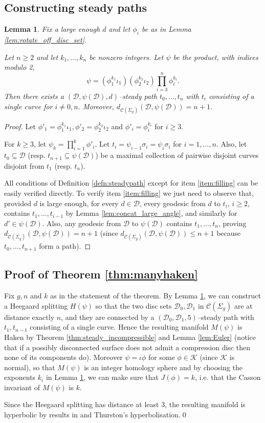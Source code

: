 \documentclass[11pt, oneside]{amsart}
\newtheorem{lemma}{Lemma}[section]
\theoremstyle{definition}
\theoremstyle{definition}
\newcommand{\calC} {\ensuremath {\mathcal{C}}}
\newcommand{\calD} {\ensuremath {\mathcal{D}}}
\begin{document}
 
 \subsection{Constructing steady paths}
 
 \begin{lemma}\label{lem:product}
 Fix a large enough $d$ and let $\phi_i$ be as in Lemma \ref{lem:rotate_off_disc_set}.
 
  Let $n\geq 2$ and let $k_1,\dots,k_n$ be nonzero integers. Let $\psi$ be the product, with indices modulo 2,
  $$\psi=(\phi^{k_1}_1\iota_1)(\phi^{k_2}_2\iota_2)\prod_{i=3}^{n}\phi^{k_i}_i.$$
  Then there exists a $(\calD,\psi(\calD),d)$--steady path $t_0,\dots,t_n$ with $t_i$ consisting of a single curve for $i\neq 0,n$. Moreover, $d_{\calC(\Sigma_g)}(\calD,\psi(\calD))=n+1$.
 \end{lemma}


\begin{proof}
Let $\phi'_1=\phi^{k_1}_1\iota_1,\phi'_2=\phi^{k_2}_2\iota_2$ and $\phi'_i=\phi^{k_i}_i$ for $i\geq 3$.

For $k\geq 3$, let $\psi_k=\prod_{i=1}^{k}\phi'_i$. Let $t_i=\psi_{i-1}\sigma_i=\psi_i\sigma_i$ for $i=1,\dots,n$. Also, let $t_0\subseteq \calD$ (resp. $t_{n+1}\subseteq \psi(\calD)$) be a maximal collection of pairwise disjoint curves disjoint from $t_1$ (resp. $t_n$).

All conditions of Definition \ref{defn:steadypath} except for item \ref{item:filling} can be easily verified directly. To verify item \ref{item:filling} we just need to observe that, provided $d$ is large enough, for every $d\in\calD$, every geodesic from $d$ to $t_i$, $i\geq 2$, contains $t_1,\dots,t_{i-1}$ by Lemma \ref{lem:concat_large_angle}, and similarly for $d'\in\psi(\calD)$. Also, any geodesic from $\calD$ to $\psi(\calD)$ contains $t_1,\dots,t_n$, proving $d_{\calC(\Sigma_g)}(\calD,\psi(\calD))=n+1$ (since $d_{\calC(\Sigma_g)}(\calD,\psi(\calD))\leq n+1$ because $t_0,\dots,t_{n+1}$ form a path).
\end{proof}


\subsection{Proof of Theorem \ref{thm:manyhaken}}

Fix $g,n$ and $k$ as in the statement of the theorem. By Lemma \ref{lem:product}, we can construct a Heegaard splitting $H(\psi)$ so that the two disc sets $\calD_0,\calD_1$ in $\calC(\Sigma_g)$ are at distance exactly $n$, and they are connected by a $(\calD_0,\calD_1,5)$--steady path with $t_1,t_{n-1}$ consisting of a single curve. Hence the resulting manifold $M(\psi)$ is Haken by Theorem \ref{thm:steady_incompressible} and Lemma \ref{lem:Euler} (notice that if a possibly disconnected surface does not admit a compression disc then none of its components do). Moreover $\psi=\iota \phi$ for some $\phi\in \mathcal K$ (since $\mathcal K$ is normal), so that $M(\psi)$ is an integer homology sphere and by choosing the exponents $k_i$ in Lemma \ref{lem:product}, we can make sure that $J(\phi)=k$, i.e. that the Casson invariant of $M(\psi)$ is $k$.

Since the Heegaard splitting has distance at least 3, the resulting manifold is hyperbolic by results in \cite{Hempel:Heegaard} and Thurston's hyperbolisation.\qed




  
 
\end{document}
